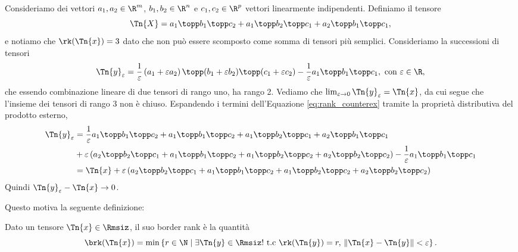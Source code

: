 \begin{example}
  Consideriamo dei vettori $ a_1,a_2 \in \R^m$, $b_1,b_2 \in \R^n$ e $c_1,c_2\in \R^p $ vettori
  linearmente indipendenti.  Definiamo il tensore 
  \begin{equation}
    \Tn{X} = a_1 \topp  b_1 \topp c_2 + a_1 \topp b_2 \topp c_1 + a_2 \topp b_1 \topp c_1,
  \end{equation}
  e notiamo che $ \rk(\Tn{x}) = 3 $ dato che non può
  essere scomposto come somma di tensori più semplici.
  Consideriamo la successioni di tensori 
  \begin{equation}
  \label{eq:rank_counterex}
  \Tn{y}_\varepsilon = \frac{1}{\varepsilon}\left( a_1 +
  \varepsilon a_2 \right) \topp (b_1 + \varepsilon b_2) \topp (c_1 + \varepsilon c_2) -
  \frac{1}{\varepsilon} a_1 \topp b_1 \topp c_1, \text{ con } \varepsilon \in \R,
  \end{equation}
  che essendo combinazione lineare di due tensori di rango uno, ha rango 2.
  Vediamo che $ \lim_{\varepsilon \to 0} \Tn{y}_\varepsilon = \Tn{x} $, da cui segue che l'insieme dei tensori di rango 3 non è chiuso.
  Espandendo i termini dell'Equazione \ref{eq:rank_counterex} tramite la proprietà distributiva del prodotto esterno,
  \begin{equation}
    \begin{aligned}
      \Tn{y}_\varepsilon &=  \frac{1}{\varepsilon} a_1 \topp b_1 \topp c_2 + a_1 \topp b_1 \topp c_2 + a_1 \topp b_2 \topp c_1
      +a_2 \topp b_1 \topp c_1  \\ &+ \varepsilon \left(a_2 \topp b_2 \topp c_1 + a_1 \topp b_1 \topp c_2 +
      a_1 \topp b_2 \topp c_2 + a_2 \topp b_2 \topp c_2 \right) - \frac{1}{\varepsilon} a_1 \topp
      b_1 \topp c_1 \\
                         &= \Tn{x} + \varepsilon\left(a_2 \topp b_2 \topp c_1 + a_1 \topp b_1 \topp c_2 +
      a_1 \topp b_2 \topp c_2 + a_2 \topp b_2 \topp c_2 \right)
    \end{aligned}
  \end{equation}
  Quindi $ \Tn{y}_\varepsilon - \Tn{x} \to 0 $.
\end{example}

Questo motiva la seguente definizione:

\begin{definition}
  Dato un tensore $ \Tn{x} \in \Rmsiz $, il suo border rank è la quantità
  \[
  \brk(\Tn{x}) = \min \left\{ r \in \N \mid \exists \Tn{y} \in \Rmsiz! \text{ t.c }
  \rk(\Tn{y})=r, \, \|\Tn{x} - \Tn{y}\|  < \varepsilon \right\}
  .\] 
\end{definition}

